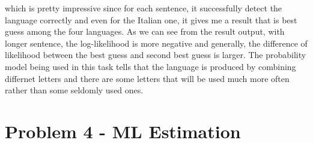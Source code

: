 \documentclass[preprint,12pt]{elsarticle}
\begin{document}
    which is pretty impressive since for each sentence, it successfully detect the language correctly and even for 
    the Italian one, it gives me a result that is best guess among the four languages. As we can see from the result
    output, with longer sentence, the log-likelihood is more negative and generally, the difference of likelihood 
    between the best guess and second best guess is larger.
    The probability model being used in this task tells that the language is produced by combining differnet letters
    and there are some letters that will be used much more often rather than some seldomly used ones.

    \section{Problem 4 - ML Estimation}
\end{document}
